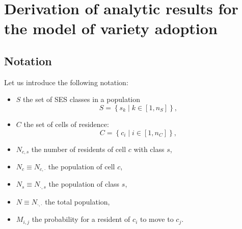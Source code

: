 \documentclass[../thesis.tex]{subfiles}
\begin{document}
\chapter{Derivation of analytic results for the model of variety adoption}
\label{ch:appendix_ses_model}

\section{Notation}
Let us introduce the following notation:
\begin{itemize}
    \item $S$ the set of \ac{SES} classes in a population
        \begin{equation}
            S = \left\{ s_k \mid k \in [1, n_S] \right\},
        \end{equation}
    \item $C$ the set of cells of residence:
        \begin{equation}
             C = \left\{ c_i \mid i \in [1, n_C] \right\},
        \end{equation}
    \item $N_{c, s}$ the number of residents of cell $c$ with class $s$,
    \item $N_{c} \equiv N_{c, \cdot}$ the population of cell $c$,
    \item $N_{s} \equiv N_{\cdot, s}$ the population of class $s$,
    \item $N \equiv N_{\cdot, \cdot}$ the total population,
    \item $M_{i, j}$ the probability for a resident of $c_i$ to move to $c_j$.
\end{itemize}
\end{document}
